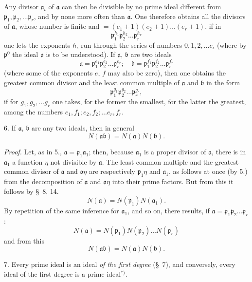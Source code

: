 \documentclass{article}
\begin{document}
Any divisor $\mathfrak{a}_{\iota}$ of $\mathfrak{a}$ can then be divisible by no prime ideal different from $\mathfrak{p}_{1}, \mathfrak{p}_{2}, \ldots \mathfrak{p}_{r}$, and by none more often than $\mathfrak{a}$. One therefore obtains all the divisors of $\mathfrak{a}$, whose number is finite and $= (e_{1}+1)(e_{2}+1)\ldots(e_{r}+1)$, if in
\[ \mathfrak{p}_{1}^{h_{1}}\mathfrak{p}_{2}^{h_{2}}\ldots\mathfrak{p}_{r}^{h_{r}} \]
one lets the exponents $h_{\iota}$ run through the series of numbers $0, 1, 2, \ldots e_{\iota}$ (where by $\mathfrak{p}^{0}$ the ideal $\mathfrak{o}$ is to be understood). If $\mathfrak{a}$, $\mathfrak{b}$ are two ideals
\[ \mathfrak{a} = \mathfrak{p}_{1}^{e_{1}}\mathfrak{p}_{2}^{e_{2}}\ldots\mathfrak{p}_{r}^{e_{r}}; \quad \mathfrak{b} = \mathfrak{p}_{1}^{f_{1}}\mathfrak{p}_{2}^{f_{2}}\ldots\mathfrak{p}_{r}^{f_{r}} \]
(where some of the exponents $e$, $f$ may also be zero), then one obtains the greatest common divisor and the least common multiple of $\mathfrak{a}$ and $\mathfrak{b}$ in the form
\[ \mathfrak{p}_{1}^{g_{1}}\mathfrak{p}_{2}^{g_{2}}\ldots\mathfrak{p}_{r}^{g_{r}}, \]
if for $g_{1}, g_{2}, \ldots g_{r}$ one takes, for the former the smallest, for the latter the greatest, among the numbers $e_{1}, f_{1}; e_{2}, f_{2}; \ldots e_{r}, f_{r}$.

6. If $\mathfrak{a}$, $\mathfrak{b}$ are any two ideals, then in general
\[ N(\mathfrak{a}\mathfrak{b}) = N(\mathfrak{a})N(\mathfrak{b}). \]

\emph{Proof.} Let, as in 5., $\mathfrak{a} = \mathfrak{p}_{1}\mathfrak{a}_{1}$; then, because $\mathfrak{a}_{1}$ is a proper divisor of $\mathfrak{a}$, there is in $\mathfrak{a}_{1}$ a function $\eta$ not divisible by $\mathfrak{a}$. The least common multiple and the greatest common divisor of $\mathfrak{a}$ and $\mathfrak{o}\eta$ are respectively $\mathfrak{p}_{1}\eta$ and $\mathfrak{a}_{1}$, as follows at once (by 5.) from the decomposition of $\mathfrak{a}$ and $\mathfrak{o}\eta$ into their prime factors. But from this it follows by §~8, 14.
\[ N(\mathfrak{a}) = N(\mathfrak{p}_{1})N(\mathfrak{a}_{1}). \]
By repetition of the same inference for $\mathfrak{a}_{1}$, and so on, there results, if $\mathfrak{a} = \mathfrak{p}_{1}\mathfrak{p}_{2}\ldots\mathfrak{p}_{r}$:
\[ N(\mathfrak{a}) = N(\mathfrak{p}_{1})N(\mathfrak{p}_{2})\ldots N(\mathfrak{p}_{r}) \]
and from this
\[ N(\mathfrak{a}\mathfrak{b}) = N(\mathfrak{a})N(\mathfrak{b}). \]

7. Every prime ideal is an ideal \emph{of the first degree} (§~7), and conversely, every ideal of the first degree is a prime ideal${}^{*)}$.
\end{document}
